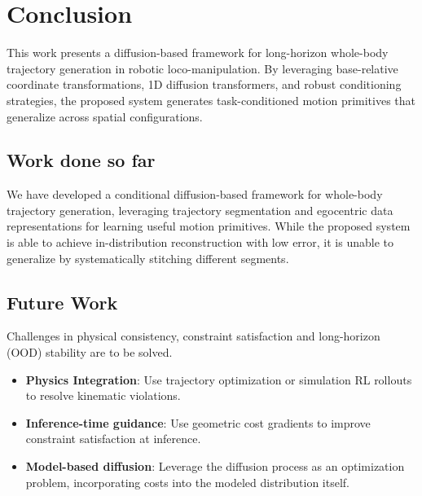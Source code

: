 \section{Conclusion}

This work presents a diffusion-based framework for long-horizon whole-body trajectory generation in robotic loco-manipulation. By leveraging base-relative coordinate transformations, 1D diffusion transformers, and robust conditioning strategies, the proposed system generates task-conditioned motion primitives that generalize across spatial configurations.

\subsection{Work done so far}
We have developed a conditional diffusion-based framework for whole-body trajectory generation, leveraging trajectory segmentation and egocentric data representations for learning useful motion primitives. While the proposed system is able to achieve in-distribution reconstruction with low error, it is unable to generalize by systematically stitching different segments.

\subsection{Future Work}
Challenges in physical consistency, constraint satisfaction and long-horizon (OOD) stability are to be solved.

\begin{itemize}
    \item \textbf{Physics Integration}: Use trajectory optimization or simulation RL rollouts to resolve kinematic violations.
    \item \textbf{Inference-time guidance}: Use geometric cost gradients to improve constraint satisfaction at inference.
    \item \textbf{Model-based diffusion}: Leverage the diffusion process as an optimization problem, incorporating costs into the modeled distribution itself.
\end{itemize}

